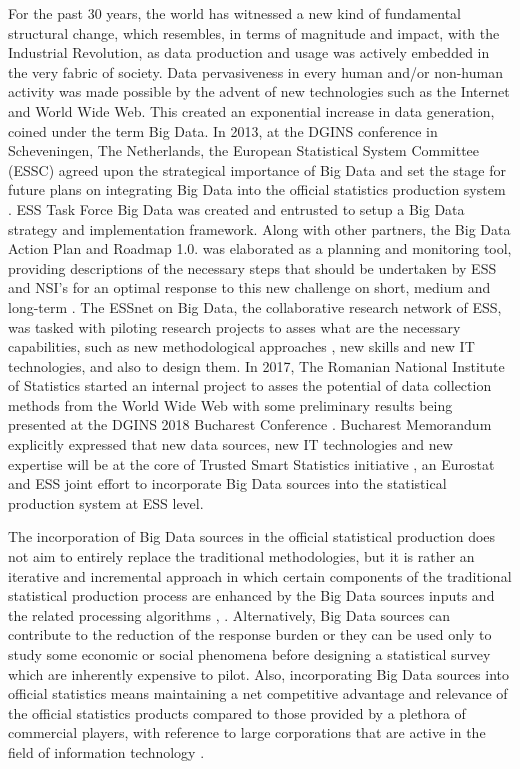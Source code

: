 \documentclass[]{article}
\begin{document}
For the past 30 years, the world has witnessed a new kind of fundamental structural change, which resembles, in terms of magnitude and impact, with the Industrial Revolution, as data production and usage was actively embedded in the very fabric of society. Data pervasiveness in every human and/or non-human activity was made possible by the advent of new technologies such as the Internet and World Wide Web. This created an exponential increase in data generation, coined under the term Big Data. In 2013, at the DGINS conference in Scheveningen, The Netherlands, the European Statistical System  Committee (ESSC) agreed upon the strategical importance of Big Data and set the stage for future plans on integrating Big Data into the official statistics production system \cite{mschv}. ESS Task Force Big Data was created and entrusted to setup a Big Data strategy and implementation framework. Along with other partners, the Big Data Action Plan and Roadmap 1.0. was elaborated as a planning and monitoring tool, providing descriptions of the necessary steps that should be undertaken by ESS and NSI's for an optimal response to this new challenge on short, medium and long-term \cite{bdar}. The ESSnet on Big Data, the collaborative research network of ESS, was tasked with piloting research projects \cite{awirth_1} to asses what are the necessary capabilities, such as new methodological approaches \cite{fricc}, new skills and new IT technologies, and also to design them. In 2017, The Romanian National Institute of Statistics started an internal project to asses the potential of data collection methods from the World Wide Web with some preliminary results being presented at the DGINS 2018 Bucharest Conference \cite{oancea}. Bucharest Memorandum \cite{mbch} explicitly expressed that new data sources, new IT technologies and new expertise will be at the core of Trusted Smart Statistics initiative \cite{ricwirskagiarei, awirth_2}, an Eurostat and ESS joint effort to incorporate Big Data sources into the statistical production system at ESS level.

The incorporation of Big Data sources in the official statistical production does not aim to entirely replace the traditional methodologies, but it is rather an iterative and incremental approach in which certain components of the traditional statistical production process are enhanced by the Big Data sources inputs and the related processing algorithms \cite{grif2016_1}, \cite{grif2016_2}. Alternatively, Big Data sources can contribute to the reduction of the response burden or they can be used only to study some economic or social phenomena before designing a statistical survey which are inherently expensive to pilot. Also, incorporating Big Data sources into official statistics means maintaining a net competitive advantage and relevance of the official statistics products compared to those provided by a plethora of commercial players, with reference to large corporations that are active in the field of information technology \cite{eu2012}.
\end{document}
